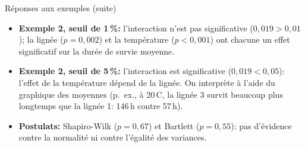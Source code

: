 \documentclass{BeamerTemplate}
\begin{document}
\begin{frame}[t]{Réponses aux exemples (suite)}

\scriptsize
\begin{itemize}\itemsep2mm
  \item \textbf{Exemple 2, seuil de 1\,\%:} l'interaction n'est pas significative
  ($0{,}019>0{,}01$); la lignée ($p=0{,}002$) et la température ($p<0{,}001$) ont
  chacune un effet significatif sur la durée de survie moyenne.
  \item \textbf{Exemple 2, seuil de 5\,\%:} l'interaction est significative
  ($0{,}019<0{,}05$): l'effet de la température dépend de la lignée. On interprète à
  l'aide du graphique des moyennes (p.\ ex., à 20\,\textdegree C, la lignée 3 survit
  beaucoup plus longtemps que la lignée 1: 146\,h contre 57\,h).
  \item \textbf{Postulats:} Shapiro-Wilk ($p=0{,}67$) et Bartlett ($p=0{,}55$):
  pas d'évidence contre la normalité ni contre l'égalité des variances.
\end{itemize}

\end{frame}
\end{document}
